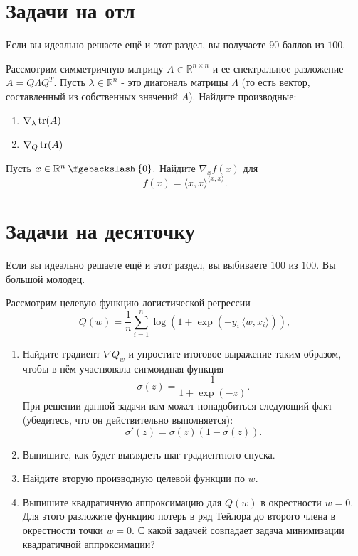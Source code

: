 \documentclass[12pt, a4paper, oneside]{article}
\newcommand{\mysetminus}{\mathbin{\fgebackslash}}
\begin{document}
\section*{Задачи на отл}

Если вы идеально решаете ещё и этот раздел, вы получаете $90$ баллов из $100$.

\begin{problem}{10}
    Рассмотрим симметричную матрицу $A \in \mathbb{R}^{n \times n}$ и ее спектральное разложение $A = Q \Lambda Q^T$.
    Пусть $\lambda \in \mathbb{R}^n$ - это диагональ матрицы $\Lambda$ (то есть вектор, составленный из собственных значений $A$).
    Найдите производные:
    
    \begin{enumerate}
        \item $\nabla_{\lambda} \operatorname{tr}(A)$
        \item $\nabla_Q \operatorname{tr}(A)$
    \end{enumerate}
\end{problem}

\begin{problem}{10}
Пусть $x \in \RR^n \mysetminus \{0\}.$ Найдите $\nabla_x f(x)$ для \[f(x) = \langle x, x \rangle^{\langle x, x \rangle}.\]
\end{problem}


\section*{Задачи на десяточку}

Если вы идеально решаете ещё и этот раздел, вы выбиваете $100$ из $100$. Вы большой молодец. 

\begin{problem}{10}
    Рассмотрим целевую функцию логистической регрессии 
    \[
    Q(w) = \frac{1}{n} \sum_{i=1}^{n} \log (1 + \exp(-y_i \, \langle w, x_i\rangle)),
    \]
    
    \begin{enumerate} 
        \item Найдите градиент $\nabla Q_w$ и упростите итоговое выражение таким образом, чтобы в нём участвовала сигмоидная функция 
        $$\sigma(z) = \frac{1}{1 + \exp(-z)}.$$ При решении данной задачи вам может понадобиться следующий факт (убедитесь, что он действительно выполняется):
        $$\sigma'(z) = \sigma(z) (1- \sigma(z)).$$ 
        \item Выпишите, как будет выглядеть шаг градиентного спуска.
        \item Найдите вторую производную целевой функции по $w$.
        \item Выпишите квадратичную аппроксимацию для $Q(w)$ в окрестности $w=0$. Для этого разложите функцию потерь в ряд Тейлора до второго члена в окрестности точки $w=0$. С какой задачей совпадает задача минимизации квадратичной аппроксимации?
    \end{enumerate} 
\end{problem}
\end{document}
